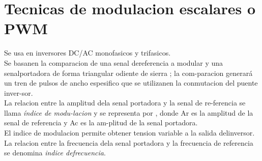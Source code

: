 \documentclass[11pt,a4paper]{article}
\begin{document}
\part{Tecnicas de modulacion escalares o PWM}

Se usa en inversores  DC/AC monofasicos y trifasicos.\\
Se basanen la comparacion de una senal dereferencia  a  modular  y  una  senalportadora  de  forma  triangular  odiente de sierra ; la com-paracion generará un tren de pulsos de ancho espesifico que se utilizanen la conmutacion del puente inver-sor.\\
La relacion entre la amplitud dela senal portadora y la senal de re-ferencia se llama \emph{índice de modu-lacion} y  se  representa  por  ,  donde  Ar  es  la  amplitud  de  la senal de referencia y Ac es la am-plitud de la senal portadora.\\
El indice  de  modulacion  permite  obtener tension variable a la salida delinversor.\\
La relacion entre la frecuencia dela senal portadora y la frecuencia de referencia  se  denomina  \emph{indice  defrecuencia}.
\end{document}

